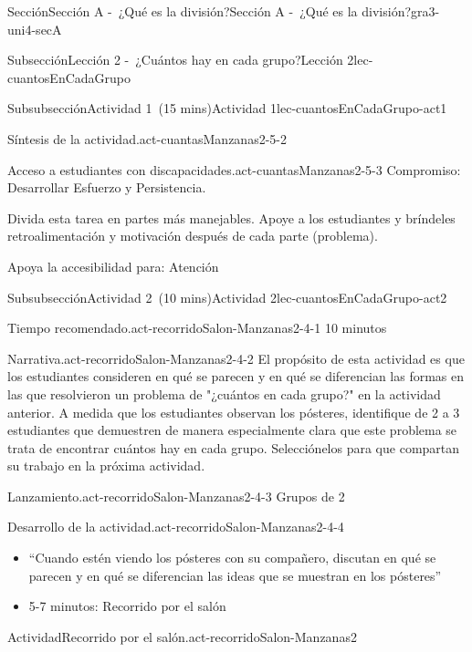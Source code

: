 \documentclass[oneside,10pt,]{article}
\begin{document}
\begin{sectionptx}{Sección}{Sección A -~¿Qué es la división?}{}{Sección A -~¿Qué es la división?}{}{}{gra3-uni4-secA}
\begin{subsectionptx}{Subsección}{Lección 2 -~¿Cuántos hay en cada grupo?}{}{Lección 2}{}{}{lec-cuantosEnCadaGrupo}
\begin{subsubsectionptx}{Subsubsección}{Actividad 1~(15 mins)}{}{Actividad 1}{}{}{lec-cuantosEnCadaGrupo-act1}
\begin{paragraphs}{Síntesis de la actividad.}{act-cuantasManzanas2-5-2}
\end{paragraphs}%
\begin{paragraphs}{Acceso a estudiantes con discapacidades.}{act-cuantasManzanas2-5-3}%
Compromiso: Desarrollar Esfuerzo y Persistencia.%
\par
Divida esta tarea en partes más manejables. Apoye a los estudiantes y bríndeles retroalimentación y motivación después de cada parte (problema).%
\par
Apoya la accesibilidad para: Atención%
\end{paragraphs}%
\end{subsubsectionptx}
%
%
\typeout{************************************************}
\typeout{************************************************}
%
\begin{subsubsectionptx}{Subsubsección}{Actividad 2~(10 mins)}{}{Actividad 2}{}{}{lec-cuantosEnCadaGrupo-act2}
\par
\begin{paragraphs}{Tiempo recomendado.}{act-recorridoSalon-Manzanas2-4-1}%
10 minutos%
\end{paragraphs}%
\begin{paragraphs}{Narrativa.}{act-recorridoSalon-Manzanas2-4-2}%
El propósito de esta actividad es que los estudiantes consideren en qué se parecen y en qué se diferencian las formas en las que resolvieron un problema de "¿cuántos en cada grupo?" en la actividad anterior. A medida que los estudiantes observan los pósteres, identifique de 2 a 3 estudiantes que demuestren de manera especialmente clara que este problema se trata de encontrar cuántos hay en cada grupo. Selecciónelos para que compartan su trabajo en la próxima actividad.%
\end{paragraphs}%
\begin{paragraphs}{Lanzamiento.}{act-recorridoSalon-Manzanas2-4-3}%
Grupos de 2%
\end{paragraphs}%
\begin{paragraphs}{Desarrollo de la actividad.}{act-recorridoSalon-Manzanas2-4-4}%
%
\begin{itemize}[label=\textbullet]
\item{}``Cuando estén viendo los pósteres con su compañero, discutan en qué se parecen y en qué se diferencian las ideas que se muestran en los pósteres''%
\item{}5-7 minutos: Recorrido por el salón%
\end{itemize}
\end{paragraphs}%
\begin{activity}{Actividad}{Recorrido por el salón.}{act-recorridoSalon-Manzanas2}%

\end{activity}
\end{subsubsectionptx}
\end{subsectionptx}
\end{sectionptx}
\end{document}
